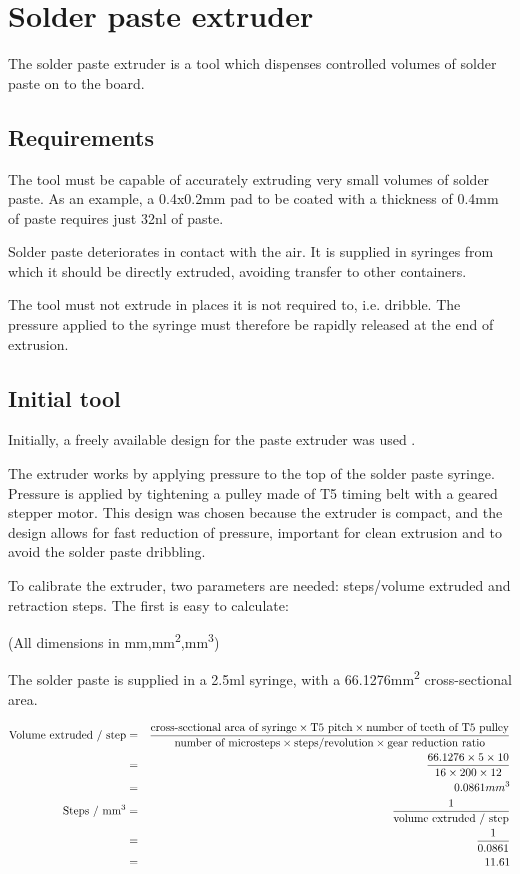 \section{Solder paste extruder}
The solder paste extruder is a tool which dispenses controlled volumes
of solder paste on to the board. 

\subsection{Requirements}
The tool must be capable of accurately extruding very small volumes of 
solder paste. As an example, a 0.4x0.2mm pad to be coated with a thickness
of 0.4mm of paste requires just 32nl of paste.

Solder paste deteriorates in contact with the air. It is supplied in
syringes from which it should be directly extruded, avoiding transfer
to other containers.

The tool must not extrude in places it is not required to, i.e. dribble.
The pressure applied to the syringe must therefore be rapidly released at the end
of extrusion.

\subsection{Initial tool}

Initially, a freely available design for the paste extruder was used \cite{thingipaste}.

The extruder works by applying pressure to the top of the solder paste syringe. Pressure is applied by tightening a pulley made
of T5 timing belt with a geared stepper motor. This design was chosen because the extruder is compact, and the design allows for
fast reduction of pressure, important for clean extrusion and to avoid the solder paste dribbling. 

To calibrate the extruder, two parameters are needed: steps/volume extruded and retraction steps. The first is easy to calculate:

(All dimensions in mm,mm\textsuperscript{2},mm\textsuperscript{3})

The solder paste is supplied in a 2.5ml syringe, with a 66.1276mm\textsuperscript{2} cross-sectional area.

\begin{eqnarray}
\text{Volume extruded / step} &=& \frac{\text{cross-sectional area of syringe} \times \text{T5 pitch} \times \text{number of teeth of T5 pulley}}{\text{number of microsteps} \times \text{steps/revolution} \times \text{gear reduction ratio}} \nonumber \\
&=&\frac{66.1276 \times 5 \times 10}{16 \times 200 \times 12} \nonumber \\
&=&0.0861mm\textsuperscript{3} \nonumber \\
	\text{Steps / mm\textsuperscript{3}} &=& \frac{1} {\text{volume extruded / step}} \nonumber \\
	&=& \frac{1}{ 0.0861} \nonumber \\
	&=& 11.61 \nonumber
\end{eqnarray}

